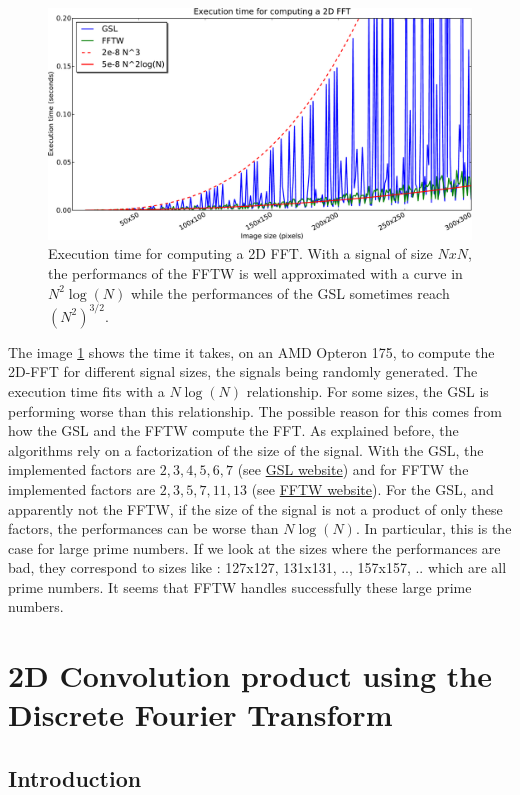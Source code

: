 \documentclass[a4paper,10pt,twoside]{article}
\begin{document}
\begin{figure}[htbp]
\center \includegraphics[width=0.6\linewidth]{Images/test_fft-crop.pdf}
\caption{\label{fig:test_fft.pdf} Execution time for computing a 2D FFT. With a signal of size $NxN$, the performancs of the FFTW is well approximated with a curve in $N^2 \log(N)$ while the performances of the GSL sometimes reach $(N^2)^{3/2}$.}
\end{figure}

The image \ref{fig:test_fft.pdf} shows the time it takes, on an AMD Opteron 175, to compute the 2D-FFT for different signal sizes, the signals being randomly generated. The execution time fits with a $N \log(N)$ relationship. For some sizes, the GSL is performing worse than this relationship. The possible reason for this comes from how the GSL and the FFTW compute the FFT. As explained before, the algorithms rely on a factorization of the size of the signal. With the GSL, the implemented factors are $2,3,4,5,6,7$ (see \href{http://www.gnu.org/software/gsl/manual/html_node/Mixed_002dradix-FFT-routines-for-complex-data.html}{GSL website}) and for FFTW the implemented factors are $2,3,5,7,11,13$ (see \href{http://www.fftw.org/fftw3_doc/Complex-DFTs.html#Complex-DFTs}{FFTW website}). For the GSL, and apparently not the FFTW, if the size of the signal is not a product of only these factors, the performances can be worse than $N \log(N)$. In particular, this is the case for large prime numbers. If we look at the sizes where the performances are bad, they correspond to sizes like : 127x127, 131x131, .., 157x157, .. which are all prime numbers. It seems that FFTW handles successfully these large prime numbers.\\

\pagebreak

\section{2D Convolution product using the Discrete Fourier Transform}
\subsection{Introduction}
\end{document}
